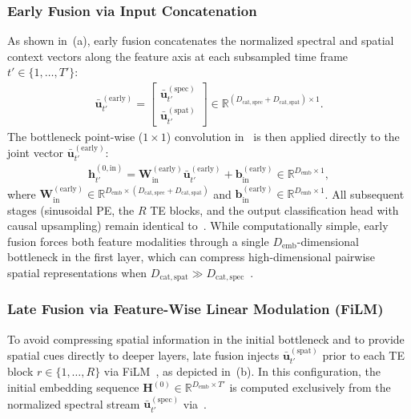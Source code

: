 \documentclass[lettersize,journal]{IEEEtran}
\begin{document}
\subsubsection{Early Fusion via Input Concatenation}
\label{sec:early_fusion}
As shown in~(a), early fusion concatenates the normalized spectral and spatial context vectors along the feature axis at each subsampled time frame $t' \in \{1, \dots, T'\}$:
\begin{align}
  \bar{\mathbf{u}}_{t'}^{(\mathrm{early})} =
  \begin{bmatrix}
    \bar{\mathbf{u}}_{t'}^{(\mathrm{spec})} \\
    \bar{\mathbf{u}}_{t'}^{(\mathrm{spat})}
  \end{bmatrix}
  \in \mathbb{R}^{(D_{\mathrm{cat,spec}} + D_{\mathrm{cat,spat}}) \times 1}.
  \label{eq:early_fusion_concat}
\end{align}
The bottleneck point-wise ($1 \times 1$) convolution in~ is then applied directly to the joint vector $\bar{\mathbf{u}}_{t'}^{(\mathrm{early})}$:
\begin{align}
  \mathbf{h}_{t'}^{(0,\mathrm{in})} = \mathbf{W}_{\mathrm{in}}^{(\mathrm{early})} \bar{\mathbf{u}}_{t'}^{(\mathrm{early})} + \mathbf{b}_{\mathrm{in}}^{(\mathrm{early})} \in \mathbb{R}^{D_{\mathrm{emb}} \times 1},
  \label{eq:early_fusion_bottleneck}
\end{align}
where $\mathbf{W}_{\mathrm{in}}^{(\mathrm{early})} \in \mathbb{R}^{D_{\mathrm{emb}} \times (D_{\mathrm{cat,spec}} + D_{\mathrm{cat,spat}})}$ and $\mathbf{b}_{\mathrm{in}}^{(\mathrm{early})} \in \mathbb{R}^{D_{\mathrm{emb}} \times 1}$. All subsequent stages (sinusoidal \gls{PE}, the $R$ \gls{TE} blocks, and the output classification head with causal upsampling) remain identical to~. While computationally simple, early fusion forces both feature modalities through a single $D_{\mathrm{emb}}$-dimensional bottleneck in the first layer, which can compress high-dimensional pairwise spatial representations when $D_{\mathrm{cat,spat}} \gg D_{\mathrm{cat,spec}}$~\cite{cornell2022overlapped}.

\subsubsection{Late Fusion via Feature-Wise Linear Modulation (FiLM)}
\label{sec:late_fusion_film}
To avoid compressing spatial information in the initial bottleneck and to provide spatial cues directly to deeper layers, late fusion injects $\bar{\mathbf{u}}_{t'}^{(\mathrm{spat})}$ prior to each \gls{TE} block $r \in \{1, \dots, R\}$ via \gls{FiLM}~\cite{perez2018film,cornell2022overlapped}, as depicted in~(b). In this configuration, the initial embedding sequence $\mathbf{H}^{(0)} \in \mathbb{R}^{D_{\mathrm{emb}} \times T'}$ is computed exclusively from the normalized spectral stream $\bar{\mathbf{u}}_{t'}^{(\mathrm{spec})}$ via~.
\end{document}
